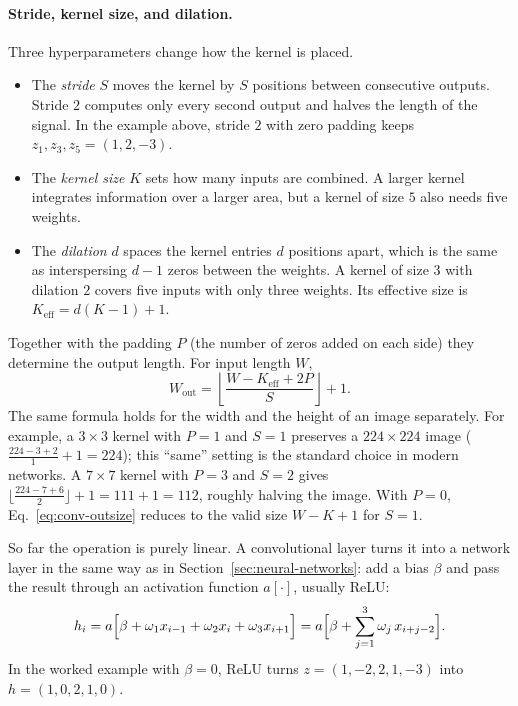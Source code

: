 \paragraph{Stride, kernel size, and dilation.}
Three hyperparameters change how the kernel is placed.
\begin{itemize}
  \item The \emph{stride} $S$ moves the kernel by $S$ positions between
        consecutive outputs. Stride $2$ computes only every second output and
        halves the length of the signal. In the example above, stride $2$ with
        zero padding keeps $z_1,z_3,z_5 = (1,2,-3)$.
  \item The \emph{kernel size} $K$ sets how many inputs are combined. A larger
        kernel integrates information over a larger area, but a kernel of size
        $5$ also needs five weights.
  \item The \emph{dilation} $d$ spaces the kernel entries $d$ positions apart,
        which is the same as interspersing $d-1$ zeros between the weights. A
        kernel of size $3$ with dilation $2$ covers five inputs with only three
        weights. Its effective size is $K_{\mathrm{eff}} = d(K-1)+1$.
\end{itemize}
\noindent
Together with the padding $P$ (the number of zeros added on each side) they
determine the output length. For input length $W$,
\begin{equation}
  W_{\mathrm{out}} =
  \left\lfloor \frac{W - K_{\mathrm{eff}} + 2P}{S} \right\rfloor + 1 .
  \label{eq:conv-outsize}
\end{equation}
\noindent
The same formula holds for the width and the height of an image separately. For
example, a $3\times3$ kernel with $P=1$ and $S=1$ preserves a $224\times224$
image ($\tfrac{224-3+2}{1}+1 = 224$); this ``same'' setting is the standard
choice in modern networks. A $7\times7$ kernel with $P=3$ and $S=2$ gives
$\lfloor\tfrac{224-7+6}{2}\rfloor+1 = 111+1 = 112$, roughly halving the image.
With $P = 0$, Eq.~\eqref{eq:conv-outsize} reduces to the valid size
$W-K+1$ for $S=1$.

So far the operation is purely linear. A convolutional layer turns it into a
network layer in the same way as in Section~\ref{sec:neural-networks}: add a bias $\beta$ and pass the result
through an activation function $a[\cdot]$, usually ReLU:
\begin{equation}
  h_i = a\Bigl[\beta + \omega_1 x_{i-1} + \omega_2 x_i + \omega_3 x_{i+1}\Bigr]
      = a\Bigl[\beta + \sum_{j=1}^{3}\omega_j\, x_{i+j-2}\Bigr].
\end{equation}
\noindent
In the worked example with $\beta = 0$, ReLU turns $z = (1,-2,2,1,-3)$ into
$h = (1,0,2,1,0)$.

